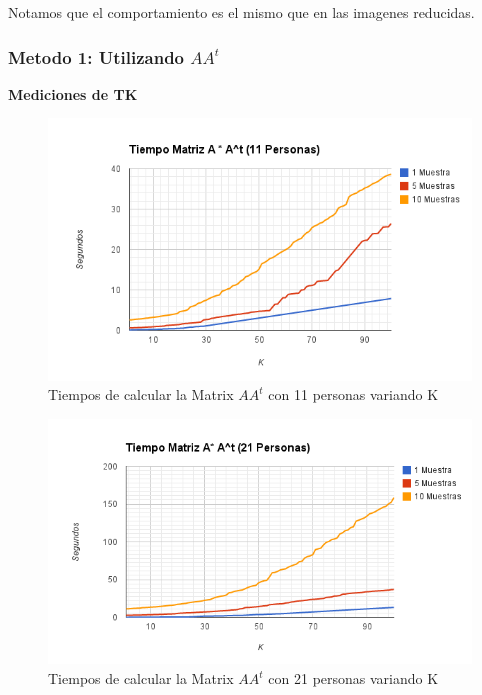 Notamos que el comportamiento es el mismo que en las imagenes reducidas.

\subsubsection{Metodo 1: Utilizando $AA^t$}

\textbf{Mediciones de TK}

\begin{figure}[H]
\includegraphics[width=1\textwidth]{img/imagef1.png}
     \caption{Tiempos de calcular la Matrix $AA^t$ con 11 personas variando K}
\end{figure}

\begin{figure}[H]
\includegraphics[width=1\textwidth]{img/imagef2.png}
     \caption{Tiempos de calcular la Matrix $AA^t$ con 21 personas variando K}
\end{figure}

